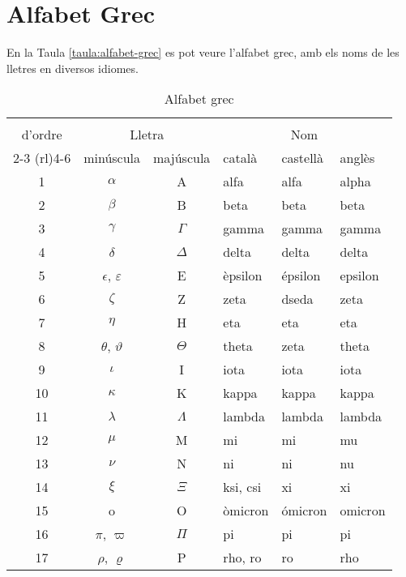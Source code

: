 \chapter{Alfabet Grec} 

 En la Taula \vref{taula:alfabet-grec} es pot veure l'alfabet grec,
 amb els noms de les lletres en diversos idiomes.

\begin{table}[h]
   \caption{\label{taula:alfabet-grec} Alfabet grec}
   \begin{center}\begin{tabular}{ccclll}
   \toprule[1pt]
   \renewcommand*{\multirowsetup}{\centering}
   \multirow{2}{15mm}{\rule{0mm}{4.5mm}N\'{u}mero\\d'ordre} & \multicolumn{2}{c}{Lletra} &
   \multicolumn{3}{c}{Nom} \\
   \cmidrule(rl){2-3} \cmidrule(rl){4-6}
    & min\'{u}scula & maj\'{u}scula & catal\`{a} & castell\`{a} &  angl\`{e}s \\
   \midrule
   1  & $\alpha$ & A & alfa & alfa &  alpha\\
   2  & $\beta$ & B & beta & beta &  beta\\
   3  & $\gamma$ & $\Gamma$ & gamma & gamma &  gamma\\
   4  & $\delta$ & $\Delta$ & delta & delta &  delta\\
   5  & $\epsilon$, $\varepsilon$ & E & \`{e}psilon & \'{e}psilon &  epsilon\\
   6  & $\zeta$ & Z & zeta & dseda &  zeta\\
   7  & $\eta$ & H & eta & eta &  eta\\
   8  & $\theta$, $\vartheta$ & $\Theta$ & theta & zeta &  theta\\
   9  & $\iota$ & I & iota & iota &  iota\\
   10 & $\kappa$ & K & kappa & kappa &  kappa\\
   11 & $\lambda$ & $\Lambda$ & lambda & lambda &  lambda\\
   12 & $\mu$ & M & mi & mi &  mu\\
   13 & $\nu$ & N & ni & ni &  nu\\
   14 & $\xi$ & $\Xi$ & ksi, csi & xi &  xi\\
   15 & o & O & \`{o}micron & \'{o}micron &  omicron\\
   16 & $\pi$, $\varpi$ & $\Pi$ & pi & pi &  pi\\
   17 & $\rho$, $\varrho$ & P & rho, ro & ro &  rho\\

\end{tabular}
\end{center}
\end{table}
